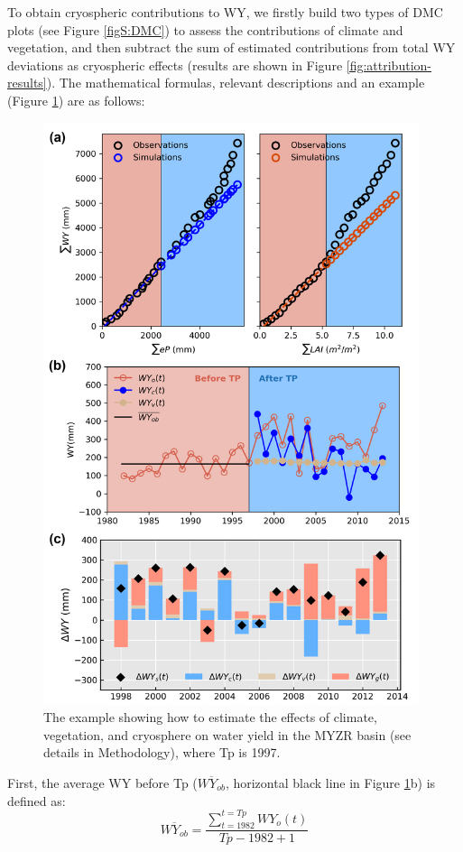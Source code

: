 \documentclass[hess, manuscript]{copernicus}
\begin{document}
To obtain cryospheric contributions to WY, we firstly build two types of DMC plots (see Figure \ref{figS:DMC}) to assess the contributions of climate and vegetation, and then subtract the sum of estimated contributions from total WY deviations as cryospheric effects (results are shown in Figure \ref{fig:attribution-results}). The mathematical formulas, relevant descriptions and an example (Figure \ref{fig:example_DMC}) are as follows:

\begin{figure}[ht]
    \includegraphics[width=11cm]{02-figures/example_DMC.png}
    \caption
    {The example showing how to estimate the effects of climate, vegetation, and cryosphere on water yield in the MYZR basin (see details in Methodology), where Tp is 1997.}
    \label{fig:example_DMC}
\end{figure}

First, the average WY before Tp ($\overline{WY_{ob}}$, horizontal black line in Figure \ref{fig:example_DMC}b) is defined as:
\begin{equation}
    \overline{WY_{ob}} = \frac{\sum_{t=1982}^{t=Tp}WY_o(t)} {Tp-1982+1}
\end{equation}
\end{document}
